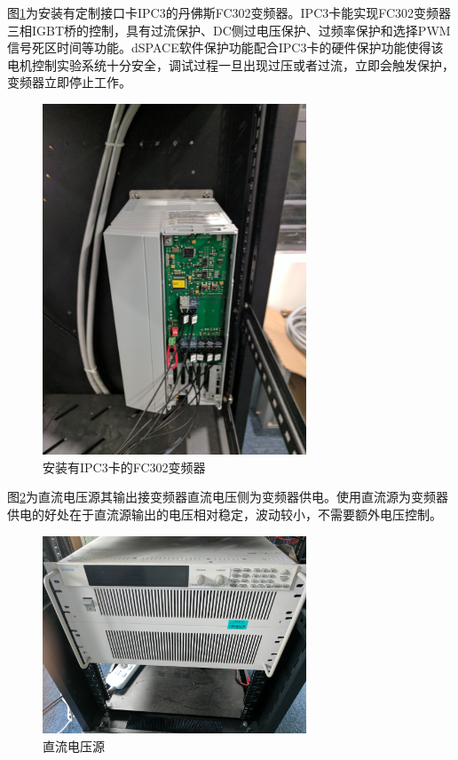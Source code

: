 图\ref{fig:inverter}为安装有定制接口卡IPC3的丹佛斯FC302变频器。IPC3卡能实现FC302变频器三相IGBT桥的控制，具有过流保护、DC侧过电压保护、过频率保护和选择PWM信号死区时间等功能。dSPACE软件保护功能配合IPC3卡的硬件保护功能使得该电机控制实验系统十分安全，调试过程一旦出现过压或者过流，立即会触发保护，变频器立即停止工作。
\begin{figure}[H]
	\centering
	\includegraphics[width=0.7\textwidth]{figs/inverter.jpg}
	\caption{安装有IPC3卡的FC302变频器}
	\label{fig:inverter}
\end{figure}
图\ref{fig:dc_source}为直流电压源其输出接变频器直流电压侧为变频器供电。使用直流源为变频器供电的好处在于直流源输出的电压相对稳定，波动较小，不需要额外电压控制。
\begin{figure}[H]
	\centering
	\includegraphics[width=0.7\textwidth]{figs/DC_power.jpg}
	\caption{直流电压源}
	\label{fig:dc_source}
\end{figure}
